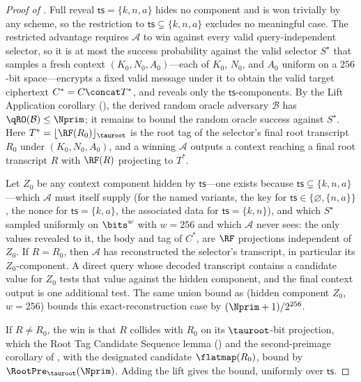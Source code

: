 \begin{proof}[Proof of ]
Full reveal $\mathsf{ts} = \{k,n,a\}$ hides no component and is won
trivially by any scheme, so the restriction to
$\mathsf{ts} \subsetneq \{k,n,a\}$ excludes no meaningful case. The
restricted advantage requires $\mathcal{A}$ to win against every
valid query-independent selector, so it is at most the success probability
against the valid selector $S^\star$ that samples a fresh context
$(K_0, N_0, A_0)$---each of $K_0$, $N_0$, and $A_0$ uniform on a
$256$-bit space---encrypts a fixed valid message under it to obtain the
valid target ciphertext $C^* = C \concat T^*$, and reveals only the
$\mathsf{ts}$-components. By the Lift Application corollary
(), the derived random oracle adversary
$\mathcal{B}$ has $\qRO(\mathcal{B}) \leq \Nprim$; it remains to bound the
random oracle success against $S^\star$. Here
$T^* = \lfloor \RF(R_0) \rfloor_{\tauroot}$ is the root tag of the
selector's final root transcript $R_0$ under $(K_0, N_0, A_0)$, and a
winning $\mathcal{A}$ outputs a context reaching a final root transcript
$R$ with $\RF(R)$ projecting to $T^*$.

Let $Z_0$ be any context component hidden by $\mathsf{ts}$---one exists
because $\mathsf{ts} \subsetneq \{k,n,a\}$---which $\mathcal{A}$ must itself
supply (for the named variants, the key for
$\mathsf{ts} \in \{\varnothing, \{n,a\}\}$, the nonce for
$\mathsf{ts} = \{k,a\}$, the associated data for $\mathsf{ts} = \{k,n\}$),
and which $S^\star$ sampled uniformly on $\bits^w$
with $w = 256$ and which $\mathcal{A}$ never sees: the only values
revealed to it, the body and tag of $C^*$, are $\RF$ projections
independent of $Z_0$. If $R = R_0$, then $\mathcal{A}$ has reconstructed
the selector's transcript, in particular its $Z_0$-component. A direct
query whose decoded transcript contains a candidate value for $Z_0$ tests
that value against the hidden component, and the final context output is
one additional test. The same union bound as  (hidden
component $Z_0$, $w = 256$) bounds this exact-reconstruction case by
$(\Nprim+1)/2^{256}$.

If $R \neq R_0$, the win is that $R$ collides with $R_0$ on its
$\tauroot$-bit projection, which the Root Tag Candidate Sequence lemma
() and the second-preimage corollary of
, with the designated candidate
$\flatmap(R_0)$, bound by $\RootPre_{\tauroot}(\Nprim)$. Adding the lift
gives the bound, uniformly over $\mathsf{ts}$.
\end{proof}

